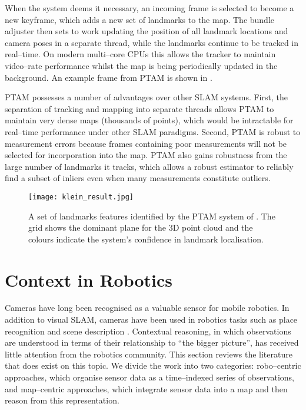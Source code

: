 When the system deems it necessary, an incoming frame is selected to
become a new keyframe, which adds a new set of landmarks to the
map. The bundle adjuster then sets to work updating the position of
all landmark locations and camera poses in a separate thread, while
the landmarks continue to be tracked in real--time. On modern
multi--core CPUs this allows the tracker to maintain video--rate
performance whilst the map is being periodically updated in the
background. An example frame from PTAM is shown in
.

PTAM possesses a number of advantages over other SLAM systems. First,
the separation of tracking and mapping into separate threads allows
PTAM to maintain very dense maps (thousands of points), which would be
intractable for real--time performance under other SLAM paradigms.
Second, PTAM is robust to measurement errors because frames containing
poor measurements will not be selected for incorporation into the
map. PTAM also gains robustness from the large number of landmarks it
tracks, which allows a robust estimator to reliably find a subset of
inliers even when many measurements constitute outliers.

\begin{figure}[htp]
\centering
\texttt{[image: klein\_result.jpg]}
\caption{A set of landmarks features identified by the PTAM system of
  \cite{Klein07}. The grid shows the dominant plane for the 3D point
  cloud and the colours indicate the system's confidence in landmark
  localisation.}
\label{fig:klein-result}
\end{figure}

\section{Context in Robotics}
Cameras have long been recognised as a valuable sensor for mobile
robotics. In addition to visual SLAM, cameras have been used in
robotics tasks such as place recognition \cite{Cummins08} and scene
description \cite{Posner08}. Contextual reasoning, in which
observations are understood in terms of their relationship to ``the
bigger picture'', has received little attention from the robotics
community. This section reviews the literature that does exist on this
topic. We divide the work into two categories: robo--centric
approaches, which organise sensor data as a time--indexed series of
observations, and map--centric approaches, which integrate sensor data
into a map and then reason from this representation.

